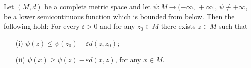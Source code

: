 \documentclass[12pt]{article}
\begin{document}
Let $(M,d)$ be a complete metric space and let $\psi : M \rightarrow (-\infty, \, +\infty]$, $\psi \not \equiv +\infty$, be a lower semicontinuous function which is bounded from below. Then the following hold: For every $\varepsilon > 0$ and for any $z_{0} \in M$ there exists $z \in M$ such that
\begin{itemize}
\item[(i)] $\psi(z) \leq \psi(z_{0}) - \varepsilon d(z,z_{0})$;
\item[(ii)] $\psi(x) \geq \psi(z) - \varepsilon d(x,z)$, for any $x \in M$.
\end{itemize}
\end{document}
